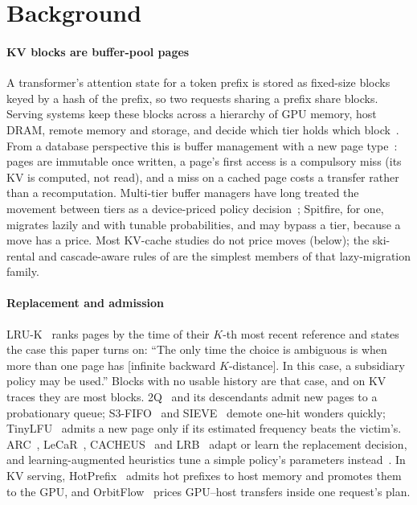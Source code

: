 \section{Background}
\label{sec:background}

\paragraph{KV blocks are buffer-pool pages} A transformer's attention state for a token prefix is
stored as fixed-size blocks keyed by a hash of the prefix, so two requests sharing a prefix share
blocks. Serving systems keep these blocks across a hierarchy of GPU memory, host DRAM, remote memory and
storage, and decide which tier holds which block~\cite{qin2024mooncake,gao2024cachedattention,
F5_liu2025lmcache,zhang2026polarkv}. From a database perspective this is buffer management with a new page
type~\cite{pan2025dbperspective}: pages are immutable once written, a page's first access is a
compulsory miss (its KV is computed, not read), and a miss on a cached page costs a transfer rather
than a recomputation. Multi-tier buffer managers have long treated the movement between tiers as a
device-priced policy decision~\cite{canim2010ssdbufferpool,zhou2021spitfire,wu2019anna}; Spitfire, for
one, migrates lazily and with tunable probabilities, and may bypass a tier, because a move has a price.
Most KV-cache studies do not price moves (below); the ski-rental and cascade-aware rules of
 are the simplest members of that lazy-migration family.

\paragraph{Replacement and admission} LRU-K~\cite{oneil1993lruk} ranks pages by the time of their
$K$-th most recent reference and states the case this paper turns on: ``The only time the choice is
ambiguous is when more than one page has [infinite backward $K$-distance]. In this case, a subsidiary
policy may be used.'' Blocks with no usable history are that case, and on KV traces they are most
blocks. 2Q~\cite{johnson1994twoq} and its descendants admit new pages to a probationary queue;
S3-FIFO~\cite{yang2023s3fifo} and SIEVE~\cite{zhang2024sieve} demote one-hit wonders quickly;
TinyLFU~\cite{einziger2017tinylfu} admits a new page only if its estimated frequency beats the victim's.
ARC~\cite{S7_megiddo2003arc}, LeCaR~\cite{S8_vietri2018lecar}, CACHEUS~\cite{S9_rodriguez2021cacheus} and LRB~\cite{S6_song2020lrb} adapt or learn the replacement
decision, and learning-augmented heuristics tune a simple policy's parameters
instead~\cite{xia2026lah}. In KV serving, HotPrefix~\cite{li2025hotprefix} admits hot prefixes to host
memory and promotes them to the GPU, and OrbitFlow~\cite{ma2026orbitflow} prices GPU--host transfers
inside one request's plan.

